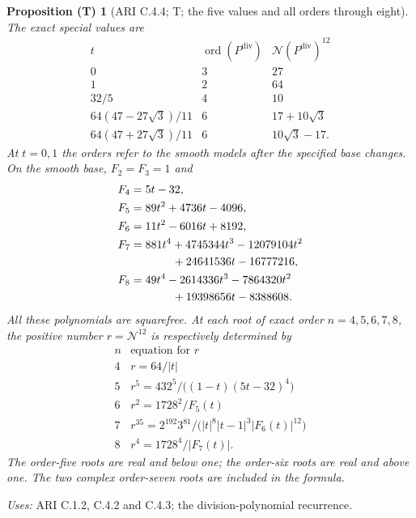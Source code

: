 \documentclass[11pt,a4paper]{article}
\theoremstyle{plain}
\newtheorem{proposition}[theorem]{Proposition (T)}
\theoremstyle{definition}
\begin{document}
\begin{proposition}[ARI C.4.4; T; the five values and all orders through eight]\label{ari:C.4.4}
The exact special values are
\[
 \begin{array}{c|c|c}
 t&\operatorname{ord}(P^{\mathrm{div}})&\mathcal N(P^{\mathrm{div}})^{12}\\ \hline
 0&3&27\\
 1&2&64\\
 32/5&4&10\\
 64(47-27\sqrt3)/11&6&17+10\sqrt3\\
 64(47+27\sqrt3)/11&6&10\sqrt3-17 .
 \end{array}
\]
At $t=0,1$ the orders refer to the smooth models after the specified
base changes. On the smooth base, $F_2=F_3=1$ and
\[
 \begin{aligned}
 F_4&=5t-32,\\
 F_5&=89t^2+4736t-4096,\\
 F_6&=11t^2-6016t+8192,\\
 F_7&=881t^4+4745344t^3-12079104t^2\\
    &\hspace{13mm}+24641536t-16777216,\\
 F_8&=49t^4-2614336t^3-7864320t^2\\
    &\hspace{13mm}+19398656t-8388608.
 \end{aligned}
\]
All these polynomials are squarefree. At each root of exact order
$n=4,5,6,7,8$, the positive number $r=\mathcal N^{12}$ is respectively
determined by
\[
 \begin{array}{c|l}
 n&\text{equation for }r\\ \hline
 4&r=64/|t|\\
 5&r^5=432^5/\bigl((1-t)(5t-32)^4\bigr)\\
 6&r^2=1728^2/F_5(t)\\
 7&r^{35}=2^{192}3^{81}/
       \bigl(|t|^8|t-1|^3|F_6(t)|^{12}\bigr)\\
 8&r^4=1728^4/|F_7(t)|.
 \end{array}
\]
The order-five roots are real and below one; the order-six roots
are real and above one. The two complex order-seven roots are
included in the formula.
\end{proposition}
\noindent\textit{Uses:} ARI C.1.2, C.4.2 and C.4.3; the division-polynomial recurrence.\par
\end{document}
